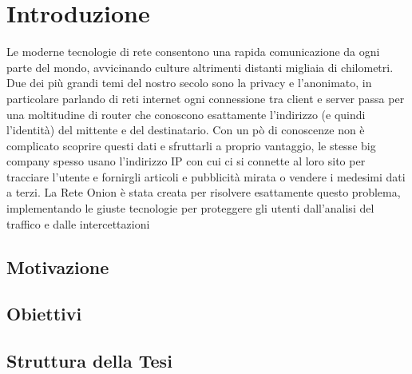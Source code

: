\chapter{Introduzione}
\label{chap:intro}

Le moderne tecnologie di rete consentono una rapida comunicazione da ogni parte del mondo, avvicinando culture altrimenti distanti migliaia di chilometri. Due dei più grandi temi del nostro secolo sono la privacy e l'anonimato, in particolare parlando di reti internet ogni connessione tra client e server passa per una moltitudine di router che conoscono esattamente l'indirizzo (e quindi l'identità) del mittente e del destinatario. Con un pò di conoscenze non è complicato scoprire questi dati e sfruttarli a proprio vantaggio, le stesse big company spesso usano l'indirizzo IP con cui ci si connette al loro sito per tracciare l'utente e fornirgli articoli e pubblicità mirata o vendere i medesimi dati a terzi. 
La Rete Onion è stata creata per risolvere esattamente questo problema, implementando le giuste tecnologie per proteggere gli utenti dall'analisi del traffico e dalle intercettazioni


\section{Motivazione}
\section{Obiettivi}
\section{Struttura della Tesi}
